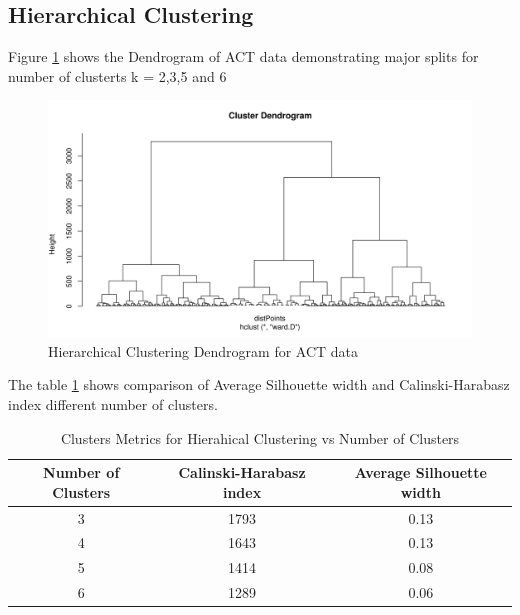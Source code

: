 \documentclass{article}
\begin{document}
\subsection{Hierarchical Clustering}
\label{appendix:actHC}
Figure \ref{fig:figACTdent} shows the Dendrogram of ACT data demonstrating major splits for number of clusterts k = 2,3,5 and 6

\begin{figure}[H]
  \centering
  \includegraphics[scale=0.5]{fig_ACT_HC_dentogram.png}
  \caption{ Hierarchical Clustering Dendrogram for ACT data}
  \label{fig:figACTdent}
\end{figure}

The table \ref{tab:act_hc_clusters} shows comparison of Average Silhouette width and Calinski-Harabasz index different number of clusters.

\begin{table}[H]
  \caption{Clusters Metrics for Hierahical Clustering vs Number of Clusters}
  \label{tab:act_hc_clusters}
  \centering
  \begin{tabular}{ c|c|c}
    \toprule
    \cmidrule(r){1-2}
    Number of Clusters & Calinski-Harabasz index & Average Silhouette width \\
    \midrule
    3 & 1793 &  0.13\\
    4 & 1643 &  0.13\\
    5 & 1414 &  0.08\\
    6 & 1289 &  0.06 \\
    \bottomrule
    \end{tabular}
\end{table}
\end{document}
